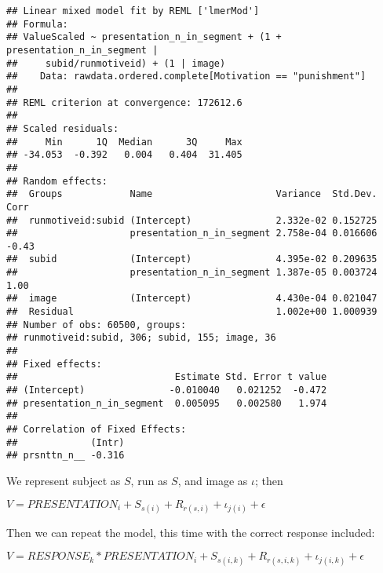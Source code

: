 \documentclass[]{article}
\begin{document}
\begin{verbatim}
## Linear mixed model fit by REML ['lmerMod']
## Formula: 
## ValueScaled ~ presentation_n_in_segment + (1 + presentation_n_in_segment |  
##     subid/runmotiveid) + (1 | image)
##    Data: rawdata.ordered.complete[Motivation == "punishment"]
## 
## REML criterion at convergence: 172612.6
## 
## Scaled residuals: 
##     Min      1Q  Median      3Q     Max 
## -34.053  -0.392   0.004   0.404  31.405 
## 
## Random effects:
##  Groups            Name                      Variance  Std.Dev. Corr 
##  runmotiveid:subid (Intercept)               2.332e-02 0.152725      
##                    presentation_n_in_segment 2.758e-04 0.016606 -0.43
##  subid             (Intercept)               4.395e-02 0.209635      
##                    presentation_n_in_segment 1.387e-05 0.003724 1.00 
##  image             (Intercept)               4.430e-04 0.021047      
##  Residual                                    1.002e+00 1.000939      
## Number of obs: 60500, groups:  
## runmotiveid:subid, 306; subid, 155; image, 36
## 
## Fixed effects:
##                            Estimate Std. Error t value
## (Intercept)               -0.010040   0.021252  -0.472
## presentation_n_in_segment  0.005095   0.002580   1.974
## 
## Correlation of Fixed Effects:
##             (Intr)
## prsnttn_n__ -0.316
\end{verbatim}

We represent subject as \(S\), run as \(S\), and image as \(\iota\);
then

\(V=\mathit{PRESENTATION}_{i} + S_{s(i)} + R_{r(s,i)} + \iota_{j(i)} + \epsilon\)

Then we can repeat the model, this time with the correct response
included:

\(V=\mathit{RESPONSE}_k*\mathit{PRESENTATION}_{i} + S_{s(i, k )} + R_{r(s,i , k )} + \iota_{j(i, k)} + \epsilon\)
\end{document}
